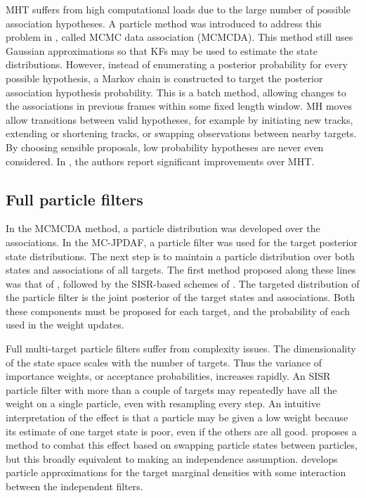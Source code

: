 MHT suffers from high computational loads due to the large number of possible association hypotheses. A particle method was introduced to address this problem in \cite{Oh2004}, called MCMC data association (MCMCDA). This method still uses Gaussian approximations so that KFs may be used to estimate the state distributions. However, instead of enumerating a posterior probability for every possible hypothesis, a Markov chain is constructed to target the posterior association hypothesis probability. This is a batch method, allowing changes to the associations in previous frames within some fixed length window. MH moves allow transitions between valid hypotheses, for example by initiating new tracks, extending or shortening tracks, or swapping observations between nearby targets. By choosing sensible proposals, low probability hypotheses are never even considered. In \cite{Oh2004,Oh2009}, the authors report significant improvements over MHT.



\subsection{Full particle filters}
In the MCMCDA method, a particle distribution was developed over the associations. In the MC-JPDAF, a particle filter was used for the target posterior state distributions. The next step is to maintain a particle distribution over both states and associations of all targets. The first method proposed along these lines was that of \cite{Hue2002}, followed by the SISR-based schemes of \cite{Doucet2002,Vermaak2005}. The targeted distribution of the particle filter is the joint posterior of the target states and associations. Both these components must be proposed for each target, and the probability of each used in the weight updates.

Full multi-target particle filters suffer from complexity issues. The dimensionality of the state space scales with the number of targets. Thus the variance of importance weights, or acceptance probabilities, increases rapidly. An SISR particle filter with more than a couple of targets may repeatedly have all the weight on a single particle, even with resampling every step. An intuitive interpretation of the effect is that a particle may be given a low weight because its estimate of one target state is poor, even if the others are all good. \cite{Orton2002} proposes a method to combat this effect based on swapping particle states between particles, but this broadly equivalent to making an independence assumption. \cite{Maskell2003} develops particle approximations for the target marginal densities with some interaction between the independent filters.

